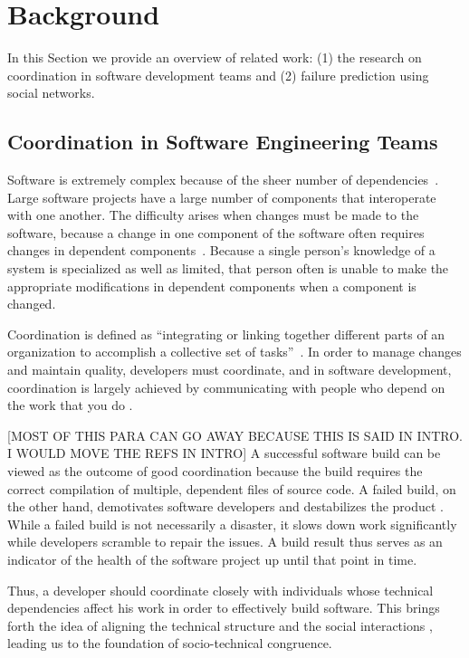 \section{Background}
\label{chap:bg}
In this Section we provide an overview of related work: (1) the research on coordination in software development teams and (2) failure prediction using social networks.

\subsection{Coordination in Software Engineering Teams}
Software is extremely complex because of the sheer number of dependencies~\cite{sawyer2004:teams}.
Large software projects have a large number of components that interoperate with one another.
The difficulty arises when changes must be made to the software, because a change in one component of the software often requires changes in dependent components~\cite{desouza:2008}. Because a single person's knowledge of a system is specialized as well as limited, that person often is unable to make the appropriate modifications in dependent components when a component is changed.

Coordination is defined as ``integrating or linking together different parts of an organization to accomplish a collective set of tasks''~\cite{vandeven1976}. In order to manage changes and maintain quality, developers must coordinate, and in software development, coordination is largely achieved by communicating with people who depend on the work that you do \cite{kraut:1995coordination}.

[MOST OF THIS PARA CAN GO AWAY BECAUSE THIS IS SAID IN INTRO. I WOULD MOVE THE REFS IN INTRO]
 A successful software build can be viewed as the outcome of good coordination because the build requires the correct compilation of multiple, dependent files of source code.
A failed build, on the other hand, demotivates software developers \cite{holck2004,damian:icgse:2007} and destabilizes the product \cite{cusumano1997}.
While a failed build is not necessarily a disaster, it slows down work significantly while developers scramble to repair the issues.
A build result thus serves as an indicator of the health of the software project up until that point in time.

Thus, a developer should coordinate closely with individuals whose technical dependencies affect his work in order to effectively build software. This brings forth the idea of aligning the technical structure and the social interactions \cite{herbsleb2007:fose}, leading us to the foundation of socio-technical congruence.

